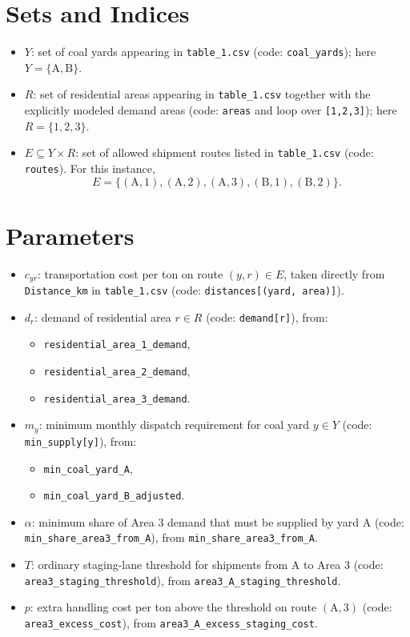 \section*{Sets and Indices}

\begin{itemize}
    \item $Y$: set of coal yards appearing in \texttt{table\_1.csv} (code: \texttt{coal\_yards}); here $Y=\{\mathrm{A},\mathrm{B}\}$.
    \item $R$: set of residential areas appearing in \texttt{table\_1.csv} together with the explicitly modeled demand areas (code: \texttt{areas} and loop over \texttt{[1,2,3]}); here $R=\{1,2,3\}$.
    \item $E \subseteq Y \times R$: set of allowed shipment routes listed in \texttt{table\_1.csv} (code: \texttt{routes}). For this instance,
    \[
    E=\{(\mathrm{A},1),(\mathrm{A},2),(\mathrm{A},3),(\mathrm{B},1),(\mathrm{B},2)\}.
    \]
\end{itemize}

\section*{Parameters}

\begin{itemize}
    \item $c_{yr}$: transportation cost per ton on route $(y,r)\in E$, taken directly from \texttt{Distance\_km} in \texttt{table\_1.csv} (code: \texttt{distances[(yard, area)]}).
    \item $d_r$: demand of residential area $r\in R$ (code: \texttt{demand[r]}), from:
    \begin{itemize}
        \item \texttt{residential\_area\_1\_demand},
        \item \texttt{residential\_area\_2\_demand},
        \item \texttt{residential\_area\_3\_demand}.
    \end{itemize}
    \item $m_y$: minimum monthly dispatch requirement for coal yard $y\in Y$ (code: \texttt{min\_supply[y]}), from:
    \begin{itemize}
        \item \texttt{min\_coal\_yard\_A},
        \item \texttt{min\_coal\_yard\_B\_adjusted}.
    \end{itemize}
    \item $\alpha$: minimum share of Area 3 demand that must be supplied by yard A (code: \texttt{min\_share\_area3\_from\_A}), from \texttt{min\_share\_area3\_from\_A}.
    \item $T$: ordinary staging-lane threshold for shipments from A to Area 3 (code: \texttt{area3\_staging\_threshold}), from \texttt{area3\_A\_staging\_threshold}.
    \item $p$: extra handling cost per ton above the threshold on route $(\mathrm{A},3)$ (code: \texttt{area3\_excess\_cost}), from \texttt{area3\_A\_excess\_staging\_cost}.
\end{itemize}

